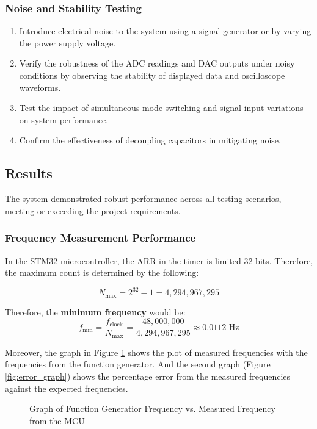 \subsubsection{Noise and Stability Testing}
\begin{enumerate}[leftmargin=2em]
    \item Introduce electrical noise to the system using a signal generator or by varying the power supply voltage.
    \item Verify the robustness of the ADC readings and DAC outputs under noisy conditions by observing the stability of displayed data and oscilloscope waveforms.
    \item Test the impact of simultaneous mode switching and signal input variations on system performance.
    \item Confirm the effectiveness of decoupling capacitors in mitigating noise.
\end{enumerate}

\subsection{Results}
The system demonstrated robust performance across all testing scenarios, meeting or exceeding the project requirements.

\subsubsection{Frequency Measurement Performance}\label{sec:freq_measurement}
In the STM32 microcontroller, the ARR in the timer is limited 32 bits. Therefore, the maximum count is determined by the following:

$$N_{\text{max}} = 2^{32} - 1 = 4,294,967,295$$

Therefore, the \textbf{minimum frequency} would be:
$$f_{\text{min}} = \frac{f_{\text{clock}}}{N_{\text{max}}} = \frac{48,000,000}{4,294,967,295} \approx 0.0112 \text{ Hz}$$

\noindent Moreover, the graph in Figure \ref{fig:fmeasured_graph} shows the plot of measured frequencies with the frequencies from the function generator. And the second graph (Figure \ref{fig:error_graph}) shows the percentage error from the measured frequencies against the expected frequencies.

\begin{figure}[H]
    \centering
    
    \caption{Graph of Function Generatior Frequency vs. Measured Frequency from the MCU}
    \label{fig:fmeasured_graph}
\end{figure}

